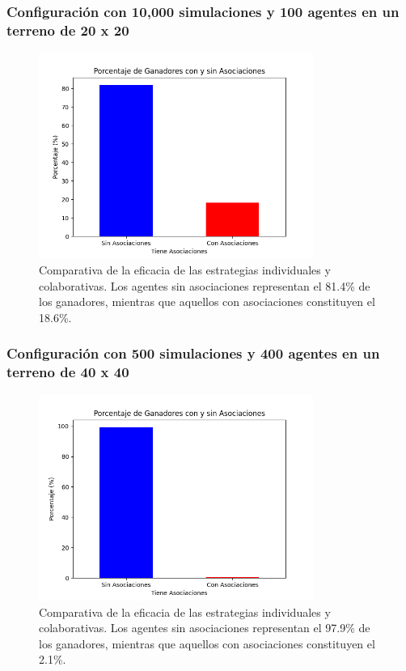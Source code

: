 \documentclass[11pt]{article}
\begin{document}
\subsubsection{Configuración con 10,000 simulaciones y 100 agentes en un terreno de 20 x 20}
\begin{figure}[H]
    \centering
    \includegraphics[width=0.8\textwidth]{images/association_metrics_num_simulations10000_size20x20_agents_count100.png}
    \caption{Comparativa de la eficacia de las estrategias individuales y colaborativas. Los agentes sin asociaciones representan el 81.4\% de los ganadores, mientras que aquellos con asociaciones constituyen el 18.6\%.}

\end{figure}

\subsubsection{Configuración con 500 simulaciones y 400 agentes en un terreno de 40 x 40}
\begin{figure}[H]
    \centering
    \includegraphics[width=0.8\textwidth]{images/association_metrics_num_simulations500_size40x40_agents_count500.png}
    \caption{Comparativa de la eficacia de las estrategias individuales y colaborativas. Los agentes sin asociaciones representan el 97.9\% de los ganadores, mientras que aquellos con asociaciones constituyen el 2.1\%.}

\end{figure}
\end{document}
